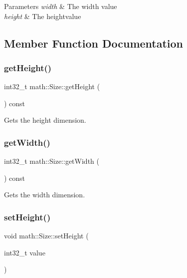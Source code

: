 \begin{DoxyParams}{Parameters}
{\em width} & The width value\\
\hline
{\em height} & The heightvalue\\
\hline
\end{DoxyParams}


\subsection{Member Function Documentation}
\mbox{\label{structmath_1_1_size_a706771feb56c568079f774e0afb3859f}} 
\subsubsection{\texorpdfstring{getHeight()}{getHeight()}}
{\footnotesize\ttfamily int32\+\_\+t math\+::\+Size\+::get\+Height (\begin{DoxyParamCaption}{ }\end{DoxyParamCaption}) const\hspace{0.3cm}{\ttfamily [inline]}}



Gets the height dimension. 

\mbox{\label{structmath_1_1_size_a50f846ffa0f6fc66153d49205447727c}} 
\subsubsection{\texorpdfstring{getWidth()}{getWidth()}}
{\footnotesize\ttfamily int32\+\_\+t math\+::\+Size\+::get\+Width (\begin{DoxyParamCaption}{ }\end{DoxyParamCaption}) const\hspace{0.3cm}{\ttfamily [inline]}}



Gets the width dimension. 

\mbox{\label{structmath_1_1_size_a1a15360158e65dd785e712d4969d5eb2}} 
\subsubsection{\texorpdfstring{setHeight()}{setHeight()}}
{\footnotesize\ttfamily void math\+::\+Size\+::set\+Height (\begin{DoxyParamCaption}\item[{int32\+\_\+t}]{value }\end{DoxyParamCaption})\hspace{0.3cm}{\ttfamily [inline]}}



